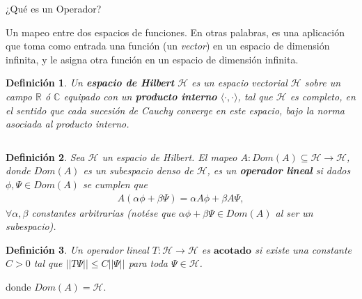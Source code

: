 \documentclass[aspectratio=1610]{beamer}
\newcommand*{\field}[1]{\mathbb{#1}}
\newtheorem*{defn}{Definición}
\begin{document}
\begin{frame}{¿Qué es un Operador?}

Un mapeo entre dos espacios de funciones. En otras palabras, es una aplicación que toma como entrada una función (un \textit{vector}) en un espacio de dimensión infinita, y le asigna otra función en un espacio de dimensión infinita.

\vspace{0.1\textheight}

\begin{defn}
    Un \textbf{espacio de Hilbert} $\mathcal{H}$ es un espacio vectorial $\mathcal{H}$ sobre un campo $\field{R}$ ó $\field{C}$ equipado con un \textbf{producto interno} $\langle\cdot,\cdot \rangle$, tal que $\mathcal{H}$ es completo, en el sentido que cada sucesión de Cauchy converge en este espacio, bajo la norma asociada al producto interno.
\end{defn}
   
\begin{columns}
\column{37em}
\end{columns}
\end{frame}


\begin{frame}{}

\begin{defn}
    Sea $\mathcal{H}$ un espacio de Hilbert. El mapeo $A:Dom(A)\subseteq\mathcal{H}\longrightarrow\mathcal{H}$, donde $Dom(A)$ es un subespacio denso de $\mathcal{H}$, es un \textbf{operador lineal} si dados $\phi,\Psi \in Dom(A)$ se cumplen que
    \begin{align*}
        A(\alpha\phi + \beta\Psi) = \alpha A\phi + \beta A \Psi,
    \end{align*}
    $\forall \alpha, \beta$ constantes arbitrarias (notése que $\alpha\phi + \beta\Psi \in Dom(A)$ al ser un subespacio).
\end{defn}

\begin{defn}
    Un operador lineal\: $T:\mathcal{H} \longrightarrow \mathcal{H}$ es $\textbf{acotado}$ si existe una constante $C > 0$ tal que $||T\Psi|| \leq C||\Psi||$ para toda $\Psi \in \mathcal{H}$.
    \label{def:opeAcot}
\end{defn}
donde $Dom(A) = \mathcal{H}$.
   
\begin{columns}
\column{37em}
\end{columns}
\end{frame}
\end{document}
